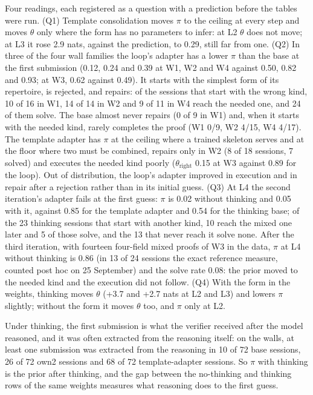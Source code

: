 \documentclass[11pt]{article}
\begin{document}
Four readings, each registered as a question with a prediction before the
tables were run. (Q1) Template consolidation moves $\pi$ to the ceiling
at every step and moves $\theta$ only where the form has no parameters to
infer: at L2 $\theta$ does not move; at L3 it rose 2.9 nats, against the
prediction, to 0.29, still far from one. (Q2) In three of the four wall
families the loop's adapter has a lower $\pi$ than the base at the first
submission (0.12, 0.24 and 0.39 at W1, W2 and W4 against 0.50, 0.82 and
0.93; at W3, 0.62 against 0.49). It starts with the simplest form of its
repertoire, is rejected, and repairs: of the sessions that start with the
wrong kind, 10 of 16 in W1, 14 of 14 in W2 and 9 of 11 in W4 reach the
needed one, and 24 of them solve. The base almost never repairs (0 of 9 in
W1) and, when it starts with the needed kind, rarely completes the proof
(W1 0/9, W2 4/15, W4 4/17). The template adapter has $\pi$ at the ceiling
where a trained skeleton serves and at the floor where two must be
combined, repairs only in W2 (8 of 18 sessions, 7 solved) and executes the
needed kind poorly ($\theta_{\text{right}}$ 0.15 at W3 against 0.89 for
the loop). Out of distribution, the loop's adapter improved in execution
and in repair after a rejection rather than in its initial guess. (Q3) At L4 the second iteration's adapter fails at the first guess: $\pi$ is 0.02 without thinking and 0.05 with it, against 0.85 for the template adapter and 0.54 for the thinking base; of the 23 thinking sessions that start with another kind, 10 reach
the mixed one later and 5 of those solve, and the 13 that never reach it solve none. After the third iteration, with fourteen four-field mixed proofs of W3 in the data, $\pi$ at L4 without thinking is 0.86 (in 13 of 24 sessions the exact reference measure, counted post hoc on 25 September) and the solve rate 0.08: the prior moved to the needed kind and the execution did not follow. (Q4) With the form in the weights, thinking moves $\theta$
(+3.7 and +2.7 nats at L2 and L3) and lowers $\pi$ slightly; without the
form it moves $\theta$ too, and $\pi$ only at L2.

Under thinking, the first submission is what the verifier received after
the model reasoned, and it was often extracted from the reasoning itself:
on the walls, at least one submission was extracted from the reasoning in
10 of 72 base sessions, 26 of 72 own2 sessions and 68 of 72
template-adapter sessions. So $\pi$ with thinking is the prior after
thinking, and the gap between the no-thinking and thinking rows of the
same weights measures what reasoning does to the first guess.
\end{document}
